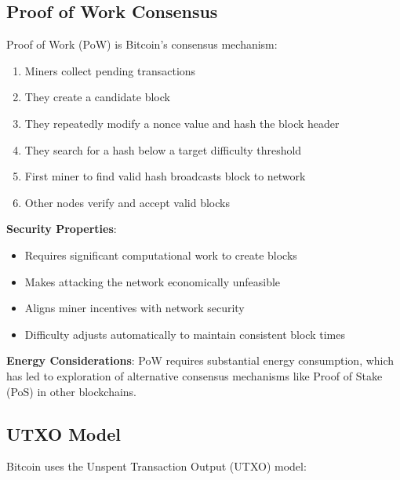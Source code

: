 \subsection{Proof of Work Consensus}
\label{subsec:proof-of-work}

Proof of Work (PoW) is Bitcoin's consensus mechanism:

\begin{enumerate}
  \item {}Miners collect pending transactions
  \item They create a candidate block
  \item They repeatedly modify a nonce value and hash the block header
  \item They search for a hash below a target difficulty threshold
  \item First miner to find valid hash broadcasts block to network
  \item Other nodes verify and accept valid blocks
\end{enumerate}

\textbf{Security Properties}:
\begin{itemize}
  \item Requires significant computational work to create blocks
  \item Makes attacking the network economically unfeasible
  \item Aligns miner incentives with network security
  \item {}Difficulty adjusts automatically to maintain consistent block times
\end{itemize}

\textbf{Energy Considerations}: PoW requires substantial energy consumption, which has led to exploration of alternative consensus mechanisms like Proof of Stake (PoS) in other blockchains.

\subsection{UTXO Model}
\label{subsec:utxo-model}

Bitcoin uses the Unspent Transaction Output (UTXO) model:


